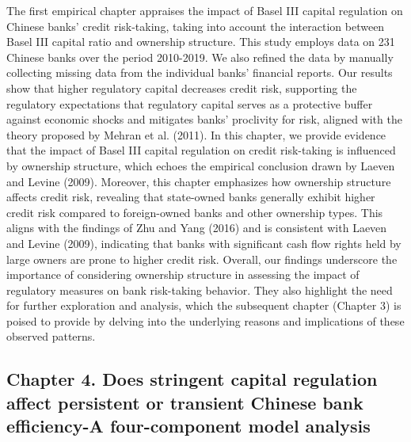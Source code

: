\documentclass[
  12pt,
  a4paper,
]{scrreprt}
\begin{document}
The first empirical chapter appraises the impact of Basel III capital
regulation on Chinese banks' credit risk-taking, taking into account the
interaction between Basel III capital ratio and ownership structure.
This study employs data on 231 Chinese banks over the period 2010-2019.
We also refined the data by manually collecting missing data from the
individual banks' financial reports. Our results show that higher
regulatory capital decreases credit risk, supporting the regulatory
expectations that regulatory capital serves as a protective buffer
against economic shocks and mitigates banks' proclivity for risk,
aligned with the theory proposed by Mehran et al. (2011). In this
chapter, we provide evidence that the impact of Basel III capital
regulation on credit risk-taking is influenced by ownership structure,
which echoes the empirical conclusion drawn by Laeven and Levine (2009).
Moreover, this chapter emphasizes how ownership structure affects credit
risk, revealing that state-owned banks generally exhibit higher credit
risk compared to foreign-owned banks and other ownership types. This
aligns with the findings of Zhu and Yang (2016) and is consistent with
Laeven and Levine (2009), indicating that banks with significant cash
flow rights held by large owners are prone to higher credit risk.
Overall, our findings underscore the importance of considering ownership
structure in assessing the impact of regulatory measures on bank
risk-taking behavior. They also highlight the need for further
exploration and analysis, which the subsequent chapter (Chapter 3) is
poised to provide by delving into the underlying reasons and
implications of these observed patterns.

\subsection{Chapter 4. Does stringent capital regulation affect
persistent or transient Chinese bank efficiency-A four-component model
analysis}\label{chapter-4.-does-stringent-capital-regulation-affect-persistent-or-transient-chinese-bank-efficiency-a-four-component-model-analysis}
\end{document}
